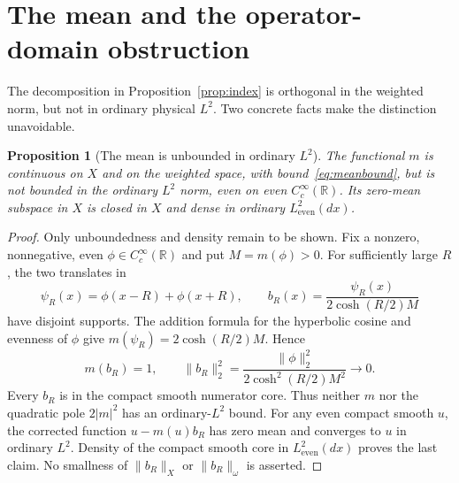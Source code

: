 \documentclass[11pt,a4paper]{article}
\numberwithin{equation}{section}
\newtheorem{proposition}[theorem]{Proposition}
\theoremstyle{remark}
\newcommand{\R}{\mathbb R}
\newcommand{\Le}{L^2_{\mathrm{even}}(dx)}
\newcommand{\norm}[1]{\lVert #1\rVert}
\begin{document}
\section{The mean and the operator-domain obstruction}\label{sec:mean}

The decomposition in Proposition~\ref{prop:index} is orthogonal in the weighted norm, but not in ordinary physical $L^2$. Two concrete facts make the distinction unavoidable.

\begin{proposition}[The mean is unbounded in ordinary $L^2$]\label{prop:mean}
The functional $m$ is continuous on $X$ and on the weighted space, with bound~\eqref{eq:meanbound}, but is not bounded in the ordinary $L^2$ norm, even on even $C_c^\infty(\R)$. Its zero-mean subspace in $X$ is closed in $X$ and dense in ordinary $\Le$.
\end{proposition}
\begin{proof}
Only unboundedness and density remain to be shown. Fix a nonzero, nonnegative, even $\phi\in C_c^\infty(\R)$ and put $M=m(\phi)>0$. For sufficiently large $R$, the two translates in
\[
 \psi_R(x)=\phi(x-R)+\phi(x+R),\qquad
 b_R(x)=\frac{\psi_R(x)}{2\cosh(R/2)M}
\]
have disjoint supports. The addition formula for the hyperbolic cosine and evenness of $\phi$ give $m(\psi_R)=2\cosh(R/2)M$. Hence
\begin{equation}\label{eq:unboundedmean}
 m(b_R)=1,\qquad
 \norm{b_R}_2^2=\frac{\norm{\phi}_2^2}{2\cosh^2(R/2)M^2}\longrightarrow0.
\end{equation}
Every $b_R$ is in the compact smooth numerator core. Thus neither $m$ nor the quadratic pole $2|m|^2$ has an ordinary-$L^2$ bound. For any even compact smooth $u$, the corrected function $u-m(u)b_R$ has zero mean and converges to $u$ in ordinary $L^2$. Density of the compact smooth core in $\Le$ proves the last claim. No smallness of $\norm{b_R}_X$ or $\norm{b_R}_\omega$ is asserted.
\end{proof}
\end{document}
